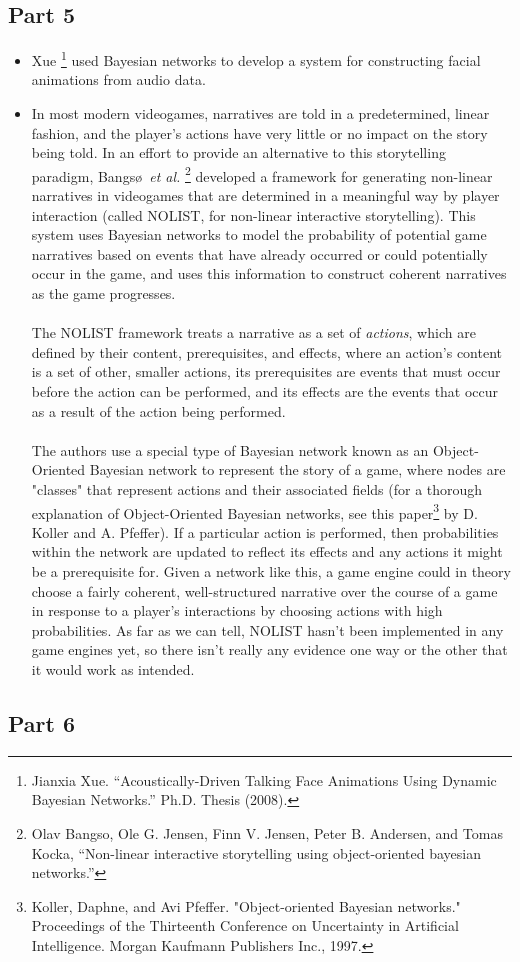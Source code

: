 \documentclass[11pt]{article}
\begin{document}
\subsection*{Part 5}
\begin{itemize}
\item Xue \footnote{Jianxia Xue. ``Acoustically-Driven Talking Face Animations Using Dynamic Bayesian Networks.'' Ph.D. Thesis (2008).} used Bayesian networks to develop a system for constructing facial animations from audio data.
\item In most modern videogames, narratives are told in a predetermined, linear fashion, and the player's actions have very little or no impact on the story being told. In an effort to provide an alternative to this storytelling paradigm, Bangs\o \ \emph{et al.} \footnote{Olav Bangso, Ole G. Jensen, Finn V. Jensen, Peter B. Andersen, and Tomas Kocka, “Non-linear interactive storytelling using object-oriented bayesian networks.”} developed a framework for generating non-linear narratives in videogames that are determined in a meaningful way by player interaction (called NOLIST, for non-linear interactive storytelling). This system uses Bayesian networks to model the probability of potential game narratives based on events that have already occurred or could potentially occur in the game, and uses this information to construct coherent narratives as the game progresses. \\
\\The NOLIST framework treats a narrative as a set of \emph{actions}, which are defined by their content, prerequisites, and effects, where an action's content is a set of other, smaller actions, its prerequisites are events that must occur before the action can be performed, and its effects are the events that occur as a result of the action being performed. \\
\\ The authors use a special type of Bayesian network known as an Object-Oriented Bayesian network to represent the story of a game, where nodes are "classes" that represent actions and their associated fields (for a thorough explanation of Object-Oriented Bayesian networks, see this paper\footnote{Koller, Daphne, and Avi Pfeffer. "Object-oriented Bayesian networks." Proceedings of the Thirteenth Conference on Uncertainty in Artificial Intelligence. Morgan Kaufmann Publishers Inc., 1997.} by D. Koller and A. Pfeffer). If a particular action is performed, then probabilities within the network are updated to reflect its effects and any actions it might be a prerequisite for. Given a network like this, a game engine could in theory choose a fairly coherent, well-structured narrative over the course of a game in response to a player's interactions by choosing actions with high probabilities. As far as we can tell, NOLIST hasn't been implemented in any game engines yet, so there isn't really any evidence one way or the other that it would work as intended. 
\end{itemize}
\subsection*{Part 6}
\end{document}
